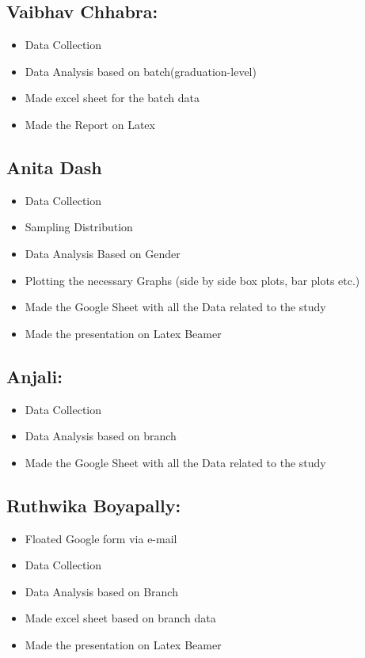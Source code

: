 \documentclass[12pt,a4paper]{report}
\begin{document}
\subsection*{Vaibhav Chhabra: }
\begin{itemize}
    \item Data Collection
    \item Data Analysis based on batch(graduation-level)
    \item Made excel sheet for the batch data
    \item Made the Report on Latex
\end{itemize}
\subsection*{Anita Dash}
\begin{itemize}
    \item Data Collection
    \item Sampling Distribution
    \item Data Analysis Based on Gender
    \item Plotting the necessary Graphs (side by side box plots, bar plots etc.)
    \item Made the Google Sheet with all the Data related to the study
    \item Made the presentation on Latex Beamer
\end{itemize}
\subsection*{Anjali: }
\begin{itemize}
    \item Data Collection
    \item Data Analysis based on branch
    \item Made the Google Sheet with all the Data related to the study
\end{itemize}
\subsection*{Ruthwika Boyapally: }
\begin{itemize}
    \item Floated Google form via e-mail
    \item Data Collection
    \item Data Analysis based on Branch 
    \item Made excel sheet based on branch data
    \item Made the presentation on Latex Beamer
\end{itemize}
\end{document}

